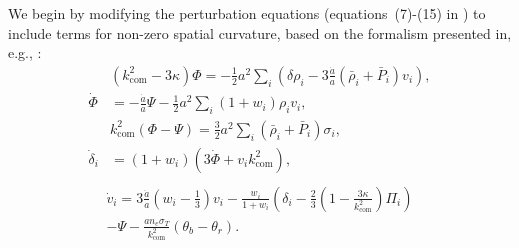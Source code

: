 \documentclass[%
 reprint,
 amsmath,amssymb,
 prd, %
]{revtex4-2}
\begin{document}
We begin by modifying the perturbation equations (equations~(7)-(15) in \cite{2022PhRvD.105h3515B}) to include terms for non-zero spatial curvature, based on the formalism presented in, e.g., \cite{1992PhR...215..203M}:
\begin{equation}\label{eq:coupled_eqns1}
\begin{aligned}
    &(k_{\mathrm{com}}^2-3\kappa)\Phi =-\frac{1}{2}a^2\sum_i (\delta\rho_i-3\frac{\dot a}{a}(\bar{\rho}_i+\bar{P}_i)v_i), \\ %
    \dot\Phi &=-\frac{\dot a}{a}\Psi-\frac{1}{2}a^2\sum_i(1+w_i)\rho_i v_i, \\ %
    &k_{\mathrm{com}}^2(\Phi-\Psi) =\frac{3}{2}a^2\sum_i (\bar{\rho}_i+\bar{P}_i)\sigma_i, \\ %
    \dot\delta_i &=(1+w_i)( 3\dot\Phi+v_i k_{\mathrm{com}}^2) , \\ %
\end{aligned}
\end{equation}
\begin{equation}\label{eq:coupled_eq2}
\begin{aligned} %
\dot v_i = 3\frac{\dot a}{a}(w_i-\frac{1}{3})v_i-\frac{w_i}{1+w_i}(\delta_i-\frac{2}{3}(1-\frac{3\kappa}{k_{\mathrm{com}}^2})\Pi_i)\\-\Psi-\frac{an_e\sigma_T}{k_{\mathrm{com}}^2}(\theta_b-\theta_r). %
\end{aligned}
\end{equation}
\end{document}
